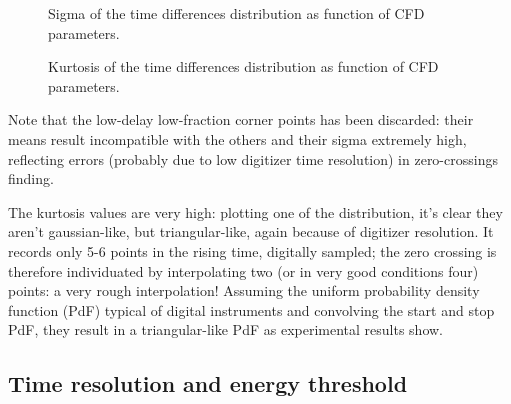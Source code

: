 \documentclass[11pt,a4 paper]{article}
\begin{document}
\begin{figure}[H]
    \centering
    \caption{Sigma of the time differences distribution as function of CFD parameters.}
    \label{fig:sigma:sim}
\end{figure}


\begin{figure}[H]
    \centering
    \caption{Kurtosis of the time differences distribution as function of CFD parameters.}
    \label{fig:kurt:sim}
\end{figure}

Note that the low-delay low-fraction corner points has been discarded: their means result incompatible with the others and their sigma extremely high, reflecting errors (probably due to low digitizer time resolution) in zero-crossings finding.

The kurtosis values are very high: plotting one of the distribution, it's clear they aren't gaussian-like, but triangular-like, again because of digitizer resolution. It records only 5-6 points in the rising time, digitally sampled; the zero crossing is therefore individuated by interpolating two (or in very good conditions four) points: a very rough interpolation! Assuming the uniform probability density function (PdF) typical of digital instruments and convolving the start and stop PdF, they result in a triangular-like PdF as experimental results show.

\subsection{Time resolution and energy threshold}
\end{document}
